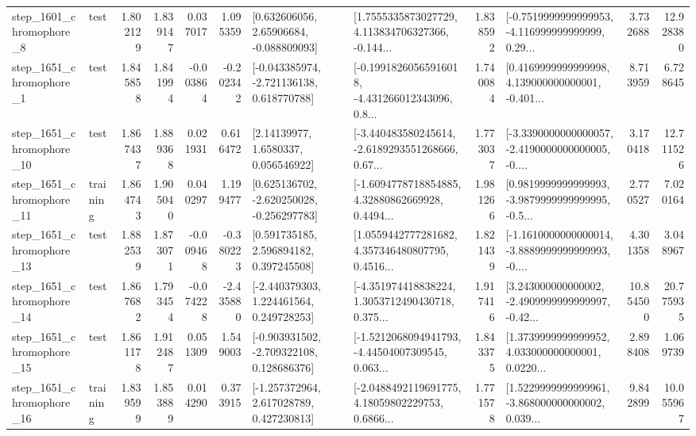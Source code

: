\begin{tabular}{llrrrrllrlrr}
  step\_1601\_chromophore\_8 &      test &      1.802129 &    1.839147 &      0.037017 &  1.095359 &     [0.632606056, 2.65906684, -0.088809093] &  [1.7555335873027729, 4.113834706327366, -0.144... &       1.838592 &  [-0.7519999999999953, -4.116999999999999, 0.29... &            3.732688 &         12.928380 \\
  step\_1651\_chromophore\_1 &      test &      1.845858 &    1.841994 &     -0.003864 & -0.202342 &   [-0.043385974, -2.721136138, 0.618770788] &  [-0.19918260565916018, -4.431266012343096, 0.8... &       1.740084 &  [0.4169999999999998, 4.139000000000001, -0.401... &            8.713959 &          6.728645 \\
 step\_1651\_chromophore\_10 &      test &      1.867437 &    1.889368 &      0.021931 &  0.616472 &        [2.14139977, 1.6580337, 0.056546922] &  [-3.440483580245614, -2.6189293551268666, 0.67... &       1.773037 &  [-3.3390000000000057, -2.4190000000000005, -0.... &            3.170418 &         12.711526 \\
 step\_1651\_chromophore\_11 &  training &      1.864743 &    1.905040 &      0.040297 &  1.199477 &   [0.625136702, -2.620250028, -0.256297783] &  [-1.6094778718854885, 4.32880862669928, 0.4494... &       1.981266 &  [0.9819999999999993, -3.9879999999999995, -0.5... &            2.770527 &          7.020164 \\
 step\_1651\_chromophore\_13 &      test &      1.882539 &    1.873071 &     -0.009468 & -0.380223 &     [0.591735185, 2.596894182, 0.397245508] &  [1.0559442777281682, 4.357346480807795, 0.4516... &       1.821439 &  [-1.1610000000000014, -3.8889999999999993, -0.... &            4.301358 &          3.048967 \\
 step\_1651\_chromophore\_14 &      test &      1.867682 &    1.793454 &     -0.074228 & -2.435880 &    [-2.440379303, 1.224461564, 0.249728253] &  [-4.351974418838224, 1.3053712490430718, 0.375... &       1.917416 &  [3.243000000000002, -2.4909999999999997, -0.42... &           10.854500 &         20.775935 \\
 step\_1651\_chromophore\_15 &      test &      1.861178 &    1.912487 &      0.051309 &  1.549003 &   [-0.903931502, -2.709322108, 0.128686376] &  [-1.5212068094941793, -4.44504007309545, 0.063... &       1.843375 &  [1.3739999999999952, 4.033000000000001, 0.0220... &            2.898408 &          1.069739 \\
 step\_1651\_chromophore\_16 &  training &      1.839599 &    1.853889 &      0.014290 &  0.373915 &    [-1.257372964, 2.617028789, 0.427230813] &  [-2.0488492119691775, 4.18059802229753, 0.6866... &       1.771578 &  [1.5229999999999961, -3.868000000000002, 0.039... &            9.842899 &         10.055967 \\

\end{tabular}
